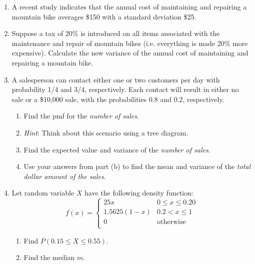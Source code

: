 \documentclass{article}
\begin{document}
\begin{enumerate}
        \item A recent study indicates that the annual cost of maintaining and repairing a mountain bike averages \$150 with a standard deviation \$25.%
    \item[] Suppose a tax of 20\% is introduced on all items associated with the maintenance and repair of mountain bikes (i.e. everything is made 20\% more expensive). Calculate the new variance of the annual cost of maintaining and repairing a mountain bike.\bigskip
    
        \item A salesperson can contact either one or two customers per day with probability 1/4 and 3/4, respectively. Each contact will result in either no sale or a \$10,000 sale, with the probabilities 0.8 and 0.2, respectively.%
    \begin{enumerate}
        \item Find the pmf for the \textit{number of sales}.
        \item[] \textit{Hint}: Think about this scenario using a tree diagram.
        \item Find the expected value and variance of the \textit{number of sales}.%
        \item Use your answers from part (b) to find the mean and variance of the \textit{total dollar amount of the sales}.
    \end{enumerate}\bigskip
    
    \item Let random variable $X$ have the following density function:
    \[
    f(x) =
        \left\{
        \begin{array}{ll}
             25x & 0 \le x \le 0.20\\
             1.5625(1 - x) & 0.2 < x \le 1\\
             0 & \text{otherwise}\\
        \end{array}
        \right.
    \]
    \begin{enumerate}
        \item Find $P(0.15 \le X \le 0.55)$.
        \item Find the median $m$.
    \end{enumerate}\bigskip%
    

\end{enumerate}
\end{document}
